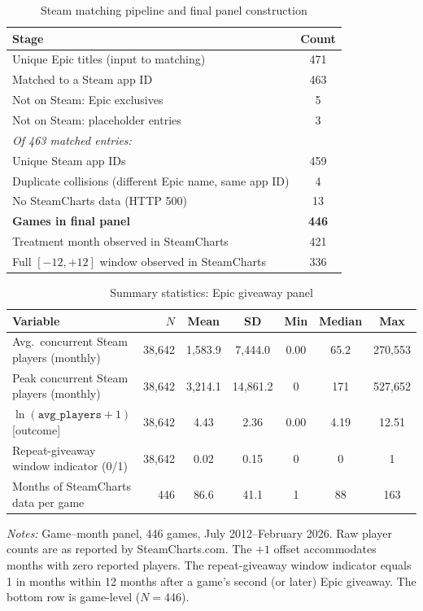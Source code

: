\documentclass[11pt]{article}
\begin{document}
\vspace{2em}

\begin{table}[H]
\centering\small
\caption{Steam matching pipeline and final panel construction}
\label{tab:pipeline}
\begin{tabular}{lc}
\toprule
Stage & Count \\
\midrule
Unique Epic titles (input to matching) & 471 \\
\quad Matched to a Steam app ID & 463 \\
\quad Not on Steam: Epic exclusives & 5 \\
\quad Not on Steam: placeholder entries & 3 \\
\midrule
\multicolumn{2}{l}{\textit{Of 463 matched entries:}} \\
\quad Unique Steam app IDs & 459 \\
\quad Duplicate collisions (different Epic name, same app ID) & 4 \\
\midrule
No SteamCharts data (HTTP 500) & 13 \\
\textbf{Games in final panel} & \textbf{446} \\
\quad Treatment month observed in SteamCharts & 421 \\
\quad Full $[-12,+12]$ window observed in SteamCharts & 336 \\
\bottomrule
\end{tabular}
\end{table}

\vspace{2em}

\begin{table}[H]
\centering\small
\caption{Summary statistics: Epic giveaway panel}
\label{tab:sumstats}
\begin{tabular}{lrccccc}
\toprule
Variable & $N$ & Mean & SD & Min & Median & Max \\
\midrule
Avg.\ concurrent Steam players (monthly) & 38,642 & 1,583.9 & 7,444.0 & 0.00 & 65.2 & 270,553 \\
Peak concurrent Steam players (monthly)  & 38,642 & 3,214.1 & 14,861.2 & 0 & 171 & 527,652 \\
$\ln(\texttt{avg\_players}+1)$ [outcome] & 38,642 & 4.43 & 2.36 & 0.00 & 4.19 & 12.51 \\
Repeat-giveaway window indicator (0/1)   & 38,642 & 0.02 & 0.15 & 0 & 0 & 1 \\
\midrule
Months of SteamCharts data per game & 446 & 86.6 & 41.1 & 1 & 88 & 163 \\
\bottomrule
\end{tabular}
\medskip

\noindent\small\textit{Notes:} Game--month panel, 446 games, July 2012--February 2026.
  Raw player counts are as reported by SteamCharts.com.
  The $+1$ offset accommodates months with zero reported players.
  The repeat-giveaway window indicator equals 1 in months within 12 months after a
  game's second (or later) Epic giveaway. The bottom row is game-level ($N = 446$).
\end{table}
\end{document}
